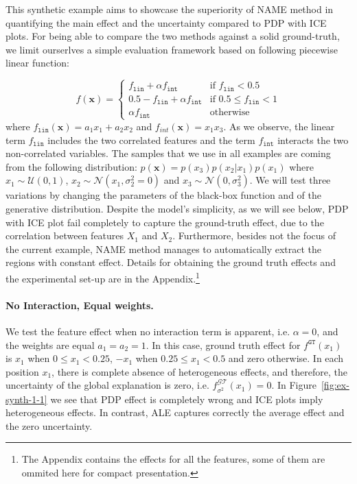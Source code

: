 \documentclass[twoside]{article}
\begin{document}
This synthetic example aims to showcase the superiority of NAME method
in quantifying the main effect and the uncertainty compared to PDP
with ICE plots. For being able to compare the two methods against a
solid ground-truth, we limit ourserlves a simple evaluation framework based
on following piecewise linear function:

\begin{equation}
  \label{eq:synth-ex-1-function}
  f(\mathbf{x}) = \begin{cases}
                    f_{\mathtt{lin}} + \alpha f_{\mathtt{int}} & \text{if $f_{\mathtt{lin}} < 0.5$ }\\
                    0.5 - f_{\mathtt{lin}} + \alpha f_{\mathtt{int}} & \text{if $0.5 \leq f_{\mathtt{lin}} < 1$}\\
                    \alpha f_{\mathtt{int}} &\text{otherwise}
                  \end{cases}
\end{equation}
%
where \(f_{\mathtt{lin}}(\mathbf{x}) = a_1 x_1 + a_2 x_2\) and
\(f_{int}(\mathbf{x}) = x_1x_3\). As we observe, the linear term
\(f_{\mathtt{lin}}\) includes the two correlated features and the term
\(f_{\mathtt{int}}\) interacts the two non-correlated variables. The
samples that we use in all examples are coming from the following
distribution: \(p(\mathbf{x}) = p(x_3)p(x_2|x_1)p(x_1)\) where
\(x_1 \sim \mathcal{U}(0,1)\),
\(x_2 \sim \mathcal{N}(x_1, \sigma_2^2=0)\) and
\(x_3 \sim \mathcal{N}(0, \sigma_3^2)\). We will test three variations
by changing the parameters of the black-box function and of the
generative distribution. Despite the model's simplicity, as we will
see below, PDP with ICE plot fail completely to capture the
ground-truth effect, due to the correlation between features \(X_1\)
and \(X_2\). Furthermore, besides not the focus of the current
example, NAME method manages to automatically extract the regions with
constant effect. Details for obtaining the ground truth effects and
the experimental set-up are in the Appendix.\footnote{The Appendix
  contains the effects for all the features, some of them are ommited
  here for compact presentation.}

\paragraph{No Interaction, Equal weights.}

We test the feature effect when no interaction term is apparent,
i.e. \(\alpha=0\), and the weights are equal \(a_1=a_2=1\).  In this
case, ground truth effect for \(f^{\mathtt{GT}}(x_1)\) is \(x_1\) when
\(0 \leq x_1 < 0.25\), \(-x_1\) when \(0.25 \leq x_1 < 0.5\) and zero
otherwise. In each position \(x_1\), there is complete absence of
heterogeneous effects, and therefore, the uncertainty of the global
explanation is zero, i.e. \(f^{\mathcal{GT}}_{\sigma^2}(x_1) = 0\). In
Figure~\ref{fig:ex-synth-1-1} we see that PDP effect is completely
wrong and ICE plots imply heterogeneous effects. In contrast, ALE
captures correctly the average effect and the zero uncertainty.
\end{document}
